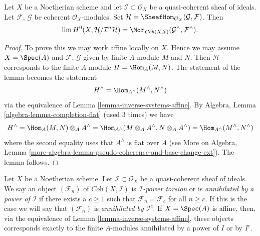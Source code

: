 \begin{lemma}
\label{lemma-completion-internal-hom}
Let $X$ be a Noetherian scheme and let $\mathcal{I} \subset \mathcal{O}_X$
be a quasi-coherent sheaf of ideals. Let $\mathcal{F}$, $\mathcal{G}$ be
coherent $\mathcal{O}_X$-modules. Set
$\mathcal{H} = \SheafHom_{\mathcal{O}_X}(\mathcal{G}, \mathcal{F})$.
Then
$$
\lim H^0(X, \mathcal{H}/\mathcal{I}^n\mathcal{H}) =
\Mor_{\textit{Coh}(X, \mathcal{I})}
(\mathcal{G}^\wedge, \mathcal{F}^\wedge).
$$
\end{lemma}

\begin{proof}
To prove this we may work affine locally on $X$.
Hence we may assume $X = \Spec(A)$ and $\mathcal{F}$, $\mathcal{G}$
given by finite $A$-module $M$ and $N$. Then $\mathcal{H}$
corresponds to the finite $A$-module $H = \Hom_A(M, N)$.
The statement of the lemma becomes the statement
$$
H^\wedge = \Hom_{A^\wedge}(M^\wedge, N^\wedge)
$$
via the equivalence of Lemma \ref{lemma-inverse-systems-affine}.
By Algebra, Lemma \ref{algebra-lemma-completion-flat}
(used 3 times) we have
$$
H^\wedge = \Hom_A(M, N) \otimes_A A^\wedge =
\Hom_{A^\wedge}(M \otimes_A A^\wedge, N \otimes_A A^\wedge) =
\Hom_{A^\wedge}(M^\wedge, N^\wedge)
$$
where the second equality uses that $A^\wedge$ is flat over $A$
(see More on Algebra, Lemma
\ref{more-algebra-lemma-pseudo-coherence-and-base-change-ext}).
The lemma follows.
\end{proof}

\noindent
Let $X$ be a Noetherian scheme. Let $\mathcal{I} \subset \mathcal{O}_X$
be a quasi-coherent sheaf of ideals. We say an object $(\mathcal{F}_n)$ of
$\textit{Coh}(X, \mathcal{I})$ is {\it $\mathcal{I}$-power torsion}
or is {\it annihilated by a power of $\mathcal{I}$} if there exists
a $c \geq 1$ such that $\mathcal{F}_n = \mathcal{F}_c$ for all $n \geq c$.
If this is the case we will say that $(\mathcal{F}_n)$ is {\it annihilated by
$\mathcal{I}^c$}. If $X = \Spec(A)$ is affine, then, via the equivalence of
Lemma \ref{lemma-inverse-systems-affine},
these objects corresponds exactly to the finite $A$-modules
annihilated by a power of $I$ or by $I^c$.

